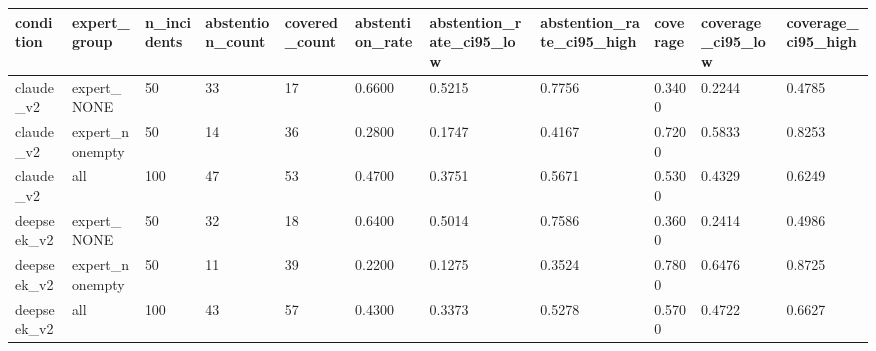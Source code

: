 \begin{table}[ht]
\centering
\begin{tabular}{lllllllllll}
\toprule
condition & expert\_group & n\_incidents & abstention\_count & covered\_count & abstention\_rate & abstention\_rate\_ci95\_low & abstention\_rate\_ci95\_high & coverage & coverage\_ci95\_low & coverage\_ci95\_high \\
\midrule
claude\_v2 & expert\_NONE & 50 & 33 & 17 & 0.6600 & 0.5215 & 0.7756 & 0.3400 & 0.2244 & 0.4785 \\
claude\_v2 & expert\_nonempty & 50 & 14 & 36 & 0.2800 & 0.1747 & 0.4167 & 0.7200 & 0.5833 & 0.8253 \\
claude\_v2 & all & 100 & 47 & 53 & 0.4700 & 0.3751 & 0.5671 & 0.5300 & 0.4329 & 0.6249 \\
deepseek\_v2 & expert\_NONE & 50 & 32 & 18 & 0.6400 & 0.5014 & 0.7586 & 0.3600 & 0.2414 & 0.4986 \\
deepseek\_v2 & expert\_nonempty & 50 & 11 & 39 & 0.2200 & 0.1275 & 0.3524 & 0.7800 & 0.6476 & 0.8725 \\
deepseek\_v2 & all & 100 & 43 & 57 & 0.4300 & 0.3373 & 0.5278 & 0.5700 & 0.4722 & 0.6627 \\
\bottomrule
\end{tabular}
\end{table}
